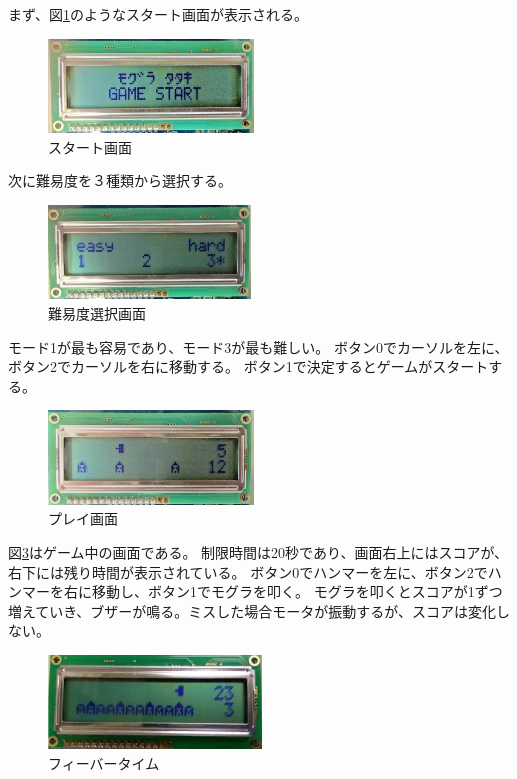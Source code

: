 \documentclass[11pt,a4j]{jsarticle}
\makeatletter
\newcommand{\figcaption}[1]{\def\@captype{figure}\caption{#1}}
\makeatother
\begin{document}
まず、図\ref{fig:start}のようなスタート画面が表示される。

\begin{figure}[H]
  \centering
  \includegraphics[height=25mm,bb=0 0 748 343]{img/start.png}
  \figcaption{スタート画面}
  \label{fig:start}
\end{figure}

次に難易度を３種類から選択する。

\begin{figure}[H]
  \centering
  \includegraphics[height=25mm,bb=0 0 748 343]{img/select_mode.png}
  \figcaption{難易度選択画面}
  \label{fig:select}
\end{figure}

モード1が最も容易であり、モード3が最も難しい。
ボタン0でカーソルを左に、ボタン2でカーソルを右に移動する。
ボタン1で決定するとゲームがスタートする。

\begin{figure}[H]
  \centering
  \includegraphics[height=25mm,bb=0 0 757 347]{img/play.png}
  \figcaption{プレイ画面}
  \label{fig:play}
\end{figure}

図\ref{fig:play}はゲーム中の画面である。
制限時間は20秒であり、画面右上にはスコアが、右下には残り時間が表示されている。
ボタン0でハンマーを左に、ボタン2でハンマーを右に移動し、ボタン1でモグラを叩く。
モグラを叩くとスコアが1ずつ増えていき、ブザーが鳴る。ミスした場合モータが振動するが、スコアは変化しない。


\begin{figure}[H]
  \centering
  \includegraphics[height=25mm,bb=0 0 765 338]{img/feaver.png}
  \figcaption{フィーバータイム}
  \label{fig:feaver}
\end{figure}
\end{document}
